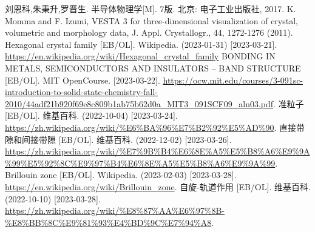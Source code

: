 \begin{thebibliography}{99}%
     刘恩科,朱秉升,罗晋生. 半导体物理学[M]. 7版. 北京: 电子工业出版社, 2017.
     K. Momma and F. Izumi, VESTA 3 for three-dimensional visualization of crystal, volumetric and morphology data, J. Appl. Crystallogr., 44, 1272-1276 (2011).
     Hexagonal crystal family [EB/OL]. Wikipedia. (2023-01-31) [2023-03-21].\\ \url{https://en.wikipedia.org/wiki/Hexagonal_crystal_family}
     BONDING IN METALS, SEMICONDUCTORS AND
    INSULATORS – BAND STRUCTURE [EB/OL]. MIT OpenCourse. [2023-03-22]. \url{https://ocw.mit.edu/courses/3-091sc-introduction-to-solid-state-chemistry-fall-2010/44adf21b920f69e8c809b1ab75b62d0a_MIT3_091SCF09_aln03.pdf}.
     准粒子 [EB/OL]. 维基百科. (2022-10-04) [2023-03-24].\\ \url{https://zh.wikipedia.org/wiki/%E6%BA%96%E7%B2%92%E5%AD%90}.
     直接带隙和间接带隙 [EB/OL]. 维基百科. (2022-12-02) [2023-03-26].\\ \url{https://zh.wikipedia.org/wiki/%E7%9B%B4%E6%8E%A5%E5%B8%A6%E9%9A%99%E5%92%8C%E9%97%B4%E6%8E%A5%E5%B8%A6%E9%9A%99}.
     Brillouin zone [EB/OL]. Wikipedia. (2023-02-03) [2023-03-28].\\ \url{https://en.wikipedia.org/wiki/Brillouin_zone}.
     自旋-轨道作用 [EB/OL]. 维基百科. (2022-10-10) [2023-03-28].\\ \url{https://zh.wikipedia.org/wiki/%E8%87%AA%E6%97%8B-%E8%BB%8C%E9%81%93%E4%BD%9C%E7%94%A8}.
\end{thebibliography}
